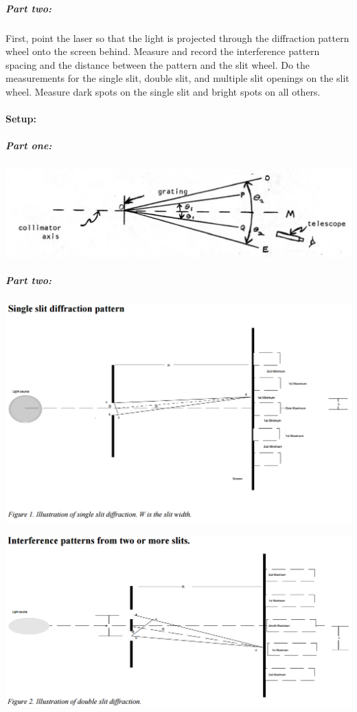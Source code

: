 \documentclass[12pt]{article}
\begin{document}
\subparagraph{Part two:} First, point the laser so that the light is projected through the diffraction pattern wheel onto the screen behind. Measure and record the interference pattern spacing and the distance between the pattern and the slit wheel. Do the measurements for the single slit, double slit, and multiple slit openings on the slit wheel. Measure dark spots on the single slit and bright spots on all others.

\paragraph{Setup:}

\subparagraph{Part one:}
\begin{center}
\includegraphics[width=14cm]{apparatus_part1.png}
\end{center}

\subparagraph{Part two:}
\begin{center}
\includegraphics[width=14cm]{singleslit_part2.png}

\includegraphics[width=14cm]{multislit_part2.png}
\end{center}
\end{document}
